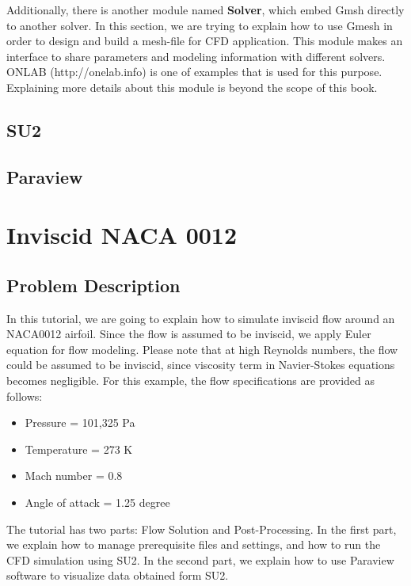 Additionally, there is another module named \textbf{Solver}, which embed Gmsh directly to another solver.
In this section, we are trying to explain how to use Gmesh in order to design and build a mesh-file for CFD application. This module makes an interface to share parameters and modeling information with different solvers. ONLAB (http://onelab.info) is one of examples that is used for this purpose. Explaining more details about this module is beyond the scope of this book.
\section{SU2}
\section{Paraview}
\chapter{Inviscid NACA 0012}
\section{Problem Description}
In this tutorial, we are going to explain how to simulate inviscid flow around an NACA0012 airfoil. Since the flow is assumed to be inviscid, we apply Euler equation for flow modeling. Please note that at high Reynolds numbers, the flow could be assumed to be inviscid, since viscosity term in Navier-Stokes equations becomes negligible. For this example, the flow specifications are provided as follows:
\begin{itemize}
    \item Pressure = 101,325 Pa
    \item Temperature = 273 K
    \item Mach number = 0.8
    \item Angle of attack = 1.25 degree
\end{itemize}
The tutorial has two parts: Flow Solution and Post-Processing. In the first part, we explain how to manage prerequisite files and settings, and how to run the CFD simulation using SU2. In the second part, we explain how to use Paraview software to visualize data obtained form SU2.
